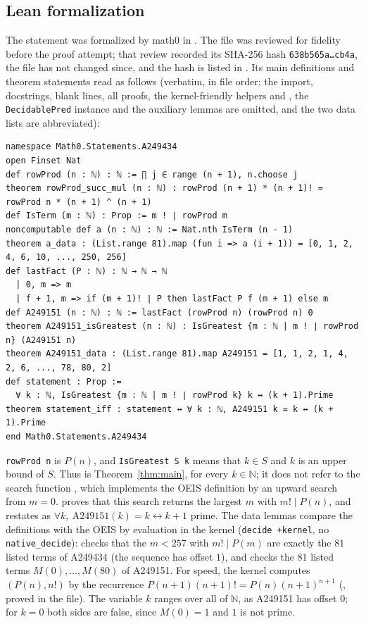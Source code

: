 \documentclass[11pt]{amsart}
\theoremstyle{plain}
\theoremstyle{definition}
\newcommand{\N}{\mathbb{N}}
\begin{document}
\subsection*{Lean formalization}
The statement was formalized by math0 in . The file was reviewed for fidelity before the proof attempt; that review recorded its SHA-256 hash \texttt{638b565a\ldots cb4a}, the file has not changed since, and the hash is listed in . Its main definitions and theorem statements read as follows (verbatim, in file order; the import, docstrings, blank lines, all proofs, the kernel-friendly helpers  and , the \texttt{DecidablePred} instance and the auxiliary lemmas are omitted, and the two data lists are abbreviated):
\begin{lstlisting}
namespace Math0.Statements.A249434
open Finset Nat
def rowProd (n : ℕ) : ℕ := ∏ j ∈ range (n + 1), n.choose j
theorem rowProd_succ_mul (n : ℕ) : rowProd (n + 1) * (n + 1)! = rowProd n * (n + 1) ^ (n + 1)
def IsTerm (m : ℕ) : Prop := m ! ∣ rowProd m
noncomputable def a (n : ℕ) : ℕ := Nat.nth IsTerm (n - 1)
theorem a_data : (List.range 81).map (fun i => a (i + 1)) = [0, 1, 2, 4, 6, 10, ..., 250, 256]
def lastFact (P : ℕ) : ℕ → ℕ → ℕ
  | 0, m => m
  | f + 1, m => if (m + 1)! ∣ P then lastFact P f (m + 1) else m
def A249151 (n : ℕ) : ℕ := lastFact (rowProd n) (rowProd n) 0
theorem A249151_isGreatest (n : ℕ) : IsGreatest {m : ℕ | m ! ∣ rowProd n} (A249151 n)
theorem A249151_data : (List.range 81).map A249151 = [1, 1, 2, 1, 4, 2, 6, ..., 78, 80, 2]
def statement : Prop :=
  ∀ k : ℕ, IsGreatest {m : ℕ | m ! ∣ rowProd k} k ↔ (k + 1).Prime
theorem statement_iff : statement ↔ ∀ k : ℕ, A249151 k = k ↔ (k + 1).Prime
end Math0.Statements.A249434
\end{lstlisting}
\texttt{rowProd n} is $P(n)$, and \texttt{IsGreatest S k} means that $k\in S$ and $k$ is an upper bound of $S$. Thus  is Theorem~\ref{thm:main}, for every $k\in\N$; it does not refer to the search function , which implements the OEIS definition by an upward search from $m=0$.  proves that this search returns the largest $m$ with $m!\mid P(n)$, and  restates  as $\forall k,\ \text{A249151}(k)=k\leftrightarrow k+1\text{ prime}$.
The data lemmas compare the definitions with the OEIS by evaluation in the kernel (\texttt{decide +kernel}, no \texttt{native\_decide}):  checks that the $m<257$ with $m!\mid P(m)$ are exactly the $81$ listed terms of A249434 (the sequence  has offset $1$), and  checks the $81$ listed terms $M(0),\dots,M(80)$ of A249151. For speed, the kernel computes $(P(n),n!)$ by the recurrence $P(n+1)(n+1)!=P(n)(n+1)^{n+1}$ (, proved in the file).
The variable $k$ ranges over all of $\N$, as A249151 has offset $0$; for $k=0$ both sides are false, since $M(0)=1$ and $1$ is not prime.
\end{document}
